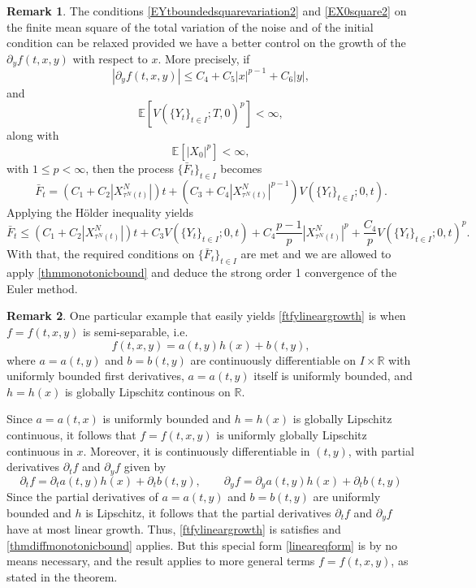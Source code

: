 \documentclass[reqno,12pt]{amsart}
\theoremstyle{plain}%
\theoremstyle{definition}
\newtheorem{rmk}{Remark}[section]
\begin{document}
\begin{rmk}
    The conditions \eqref{EYtboundedsquarevariation2} and \eqref{EX0square2} on the finite mean square of the total variation of the noise and of the initial condition can be relaxed provided we have a better control on the growth of the $\partial_y f(t, x, y)$ with respect to $x$. More precisely, if
    \[
        |\partial_y f(t, x, y)| \leq C_4 + C_5|x|^{p-1} + C_6|y|,
    \]
    and
    \[
        \mathbb{E}[V(\{Y_t\}_{t\in I}; T, 0)^p] < \infty,
    \]
    along with
    \[
        \mathbb{E}[|X_0|^p] < \infty,
    \]
    with $1 \leq p < \infty$, then the process $\{\bar F_t\}_{t\in I}$ becomes
    \[
        \bar F_t = (C_1 + C_2 |X_{\tau^N(t)}^N|)t + (C_3 + C_4 |X_{\tau^N(t)}^N|^{p-1}) V(\{Y_t\}_{t\in I}; 0, t).
    \]
    Applying the H\"older inequality yields
    \[
        \bar F_t \leq (C_1 + C_2 |X_{\tau^N(t)}^N|)t + C_3 V(\{Y_t\}_{t\in I}; 0, t) + C_4 \frac{p-1}{p}|X_{\tau^N(t)}^N|^p  + \frac{C_4}{p} V(\{Y_t\}_{t\in I}; 0, t)^p.
    \]
    With that, the required conditions on $\{\bar F_t\}_{t\in I}$ are met and we are allowed to apply \cref{thmmonotonicbound} and deduce the strong order 1 convergence of the Euler method.
\end{rmk}

\begin{rmk}
    One particular example that easily yields \eqref{ftfylineargrowth} is when $f=f(t, x, y)$ is semi-separable, i.e.
    \begin{equation}
        \label{lineareqform}
        f(t, x, y) = a(t, y)h(x) + b(t, y),
    \end{equation}
    where $a=a(t, y)$ and $b=b(t, y)$ are continuously differentiable on $I\times \mathbb{R}$ with uniformly bounded first derivatives, $a=a(t, y)$ itself is uniformly bounded, and $h=h(x)$ is globally Lipschitz continous on $\mathbb{R}$.
    
    Since $a=a(t, x)$ is uniformly bounded and $h=h(x)$ is globally Lipschitz continuous, it follows that $f=f(t, x, y)$ is uniformly globally Lipschitz continuous in $x$. Moreover, it is continuously differentiable in $(t, y)$, with partial derivatives $\partial_t f$ and $\partial_y f$ given by
    \[
        \partial_t f = \partial_t a(t, y) h(x) + \partial_t b(t, y), \qquad \partial_y f = \partial_y a(t, y) h(x) + \partial_t b(t, y)
    \]
    Since the partial derivatives of $a=a(t, y)$ and $b=b(t, y)$ are uniformly bounded and $h$ is Lipschitz, it follows that the partial derivatives $\partial_t f$ and $\partial_y f$ have at most linear growth. Thus, \eqref{ftfylineargrowth} is satisfies and \cref{thmdiffmonotonicbound} applies. But this special form \eqref{lineareqform} is by no means necessary, and the result applies to more general terms $f=f(t, x, y)$, as stated in the theorem.
\end{rmk}
\end{document}
